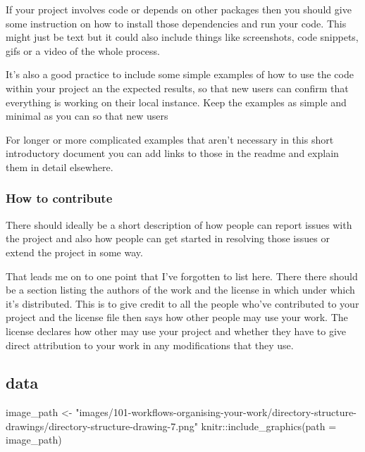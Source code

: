 \documentclass[
  letterpaper,
  DIV=11,
  numbers=noendperiod]{scrreprt}
\newenvironment{Shaded}{\begin{snugshade}}{\end{snugshade}}
\newcommand{\AttributeTok}[1]{\textcolor[rgb]{0.40,0.45,0.13}{#1}}
\newcommand{\FunctionTok}[1]{\textcolor[rgb]{0.28,0.35,0.67}{#1}}
\newcommand{\NormalTok}[1]{\textcolor[rgb]{0.00,0.23,0.31}{#1}}
\newcommand{\OtherTok}[1]{\textcolor[rgb]{0.00,0.23,0.31}{#1}}
\newcommand{\SpecialCharTok}[1]{\textcolor[rgb]{0.37,0.37,0.37}{#1}}
\newcommand{\StringTok}[1]{\textcolor[rgb]{0.13,0.47,0.30}{#1}}
\begin{document}
If your project involves code or depends on other packages then you
should give some instruction on how to install those dependencies and
run your code. This might just be text but it could also include things
like screenshots, code snippets, gifs or a video of the whole process.

It's also a good practice to include some simple examples of how to use
the code within your project an the expected results, so that new users
can confirm that everything is working on their local instance. Keep the
examples as simple and minimal as you can so that new users

For longer or more complicated examples that aren't necessary in this
short introductory document you can add links to those in the readme and
explain them in detail elsewhere.

\subsubsection{How to contribute}\label{how-to-contribute}

There should ideally be a short description of how people can report
issues with the project and also how people can get started in resolving
those issues or extend the project in some way.

That leads me on to one point that I've forgotten to list here. There
there should be a section listing the authors of the work and the
license in which under which it's distributed. This is to give credit to
all the people who've contributed to your project and the license file
then says how other people may use your work. The license declares how
other may use your project and whether they have to give direct
attribution to your work in any modifications that they use.

\subsection{data}\label{data}

\begin{Shaded}
\begin{Highlighting}[]
\NormalTok{image\_path }\OtherTok{\textless{}{-}} \StringTok{"images/101{-}workflows{-}organising{-}your{-}work/directory{-}structure{-}drawings/directory{-}structure{-}drawing{-}7.png"}
\NormalTok{knitr}\SpecialCharTok{::}\FunctionTok{include\_graphics}\NormalTok{(}\AttributeTok{path =}\NormalTok{ image\_path)}
\end{Highlighting}
\end{Shaded}
\end{document}
